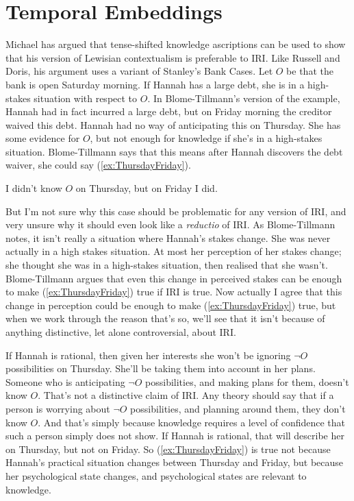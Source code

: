 \documentclass[oneside]{book}
\renewcommand{\numbex}[2]{
\begin{enumerate*}
\setcounter{enumi}{\value{paper}}
\renewcommand{\labelenumi}{(\arabic{enumi})}
#2
\end{enumerate*}
\addtocounter{paper}{#1}}
\begin{document}
\section{Temporal Embeddings} \label{sect:time}

Michael \cite{MBT2009} has argued that tense-shifted knowledge ascriptions can be used to show that his version of Lewisian contextualism is preferable to IRI. Like Russell and Doris, his argument uses a variant of Stanley's Bank Cases. Let $O$ be that the bank is open Saturday morning. If Hannah has a large debt, she is in a high-stakes situation with respect to $O$. In Blome-Tillmann's version of the example, Hannah had in fact incurred a large debt, but on Friday morning the creditor waived this debt. Hannah had no way of anticipating this on Thursday. She has some evidence for $O$, but not enough for knowledge if she's in a high-stakes situation. Blome-Tillmann says that this means after Hannah discovers the debt waiver, she could say (\ref{ex:ThursdayFriday}).

\numbex{1}{
\item \label{ex:ThursdayFriday} I didn't know $O$ on Thursday, but on Friday I did.
}

\noindent But I'm not sure why this case should be problematic for any version of IRI, and very unsure why it should even look like a \textit{reductio} of IRI. As Blome-Tillmann notes, it isn't really a situation where Hannah's stakes change. She was never actually in a high stakes situation. At most her perception of her stakes change; she thought she was in a high-stakes situation, then realised that she wasn't. Blome-Tillmann argues that even this change in perceived stakes can be enough to make (\ref{ex:ThursdayFriday}) true if IRI is true. Now actually I agree that this change in perception could be enough to make (\ref{ex:ThursdayFriday}) true, but when we work through the reason that's so, we'll see that it isn't because of anything distinctive, let alone controversial, about IRI.

If Hannah is rational, then given her interests she won't be ignoring $\neg O$ possibilities on Thursday. She'll be taking them into account in her plans. Someone who is anticipating $\neg O$ possibilities, and making plans for them, doesn't know $O$. That's not a distinctive claim of IRI. Any theory should say that if a person is worrying about $\neg O$ possibilities, and planning around them, they don't know $O$. And that's simply because knowledge requires a level of confidence that such a person simply does not show. If Hannah is rational, that will describe her on Thursday, but not on Friday. So (\ref{ex:ThursdayFriday}) is true not because Hannah's practical situation changes between Thursday and Friday, but because her psychological state changes, and psychological states are relevant to knowledge.
\end{document}
